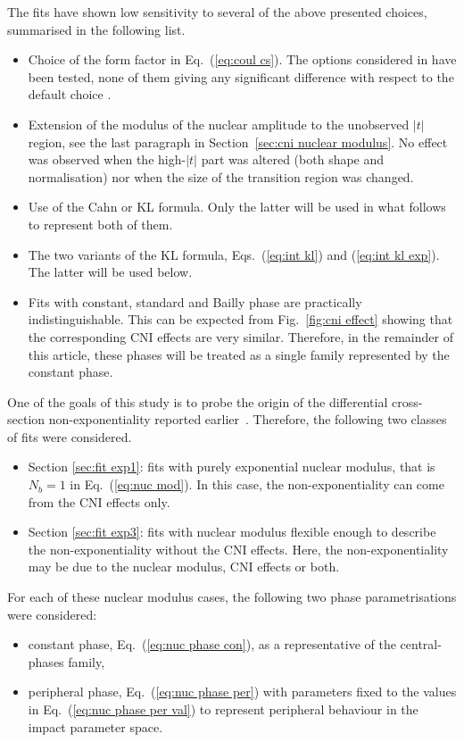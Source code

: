 The fits have shown low sensitivity to several of the above presented choices, summarised in the following list. 
\begin{itemize}
\item Choice of the form factor in Eq.~(\ref{eq:coul cs}). The options considered in \cite{elegent} have been tested, none of them giving any significant difference with respect to the default choice \cite{puckett10}.
\item Extension of the modulus of the nuclear amplitude to the unobserved $|t|$ region, see the last paragraph in Section~\ref{sec:cni nuclear modulus}. No effect was observed when the high-$|t|$ part was altered (both shape and normalisation) nor when the size of the transition region was changed.
\item Use of the Cahn or KL formula. Only the latter will be used in what follows to represent both of them.
\item The two variants of the KL formula, Eqs.~(\ref{eq:int kl}) and (\ref{eq:int kl exp}). The latter will be used below.
\item Fits with constant, standard and Bailly phase are practically indistinguishable. This can be expected from Fig.~\ref{fig:cni effect} showing that the corresponding CNI effects are very similar. Therefore, in the remainder of this article, these phases will be treated as a single family represented by the constant phase.
\end{itemize}


One of the goals of this study is to probe the origin of the differential cross-section non-exponentiality reported earlier~\cite{8tev-90m}. Therefore, the following two classes of fits were considered.
\begin{itemize}
\item Section \ref{sec:fit exp1}: fits with purely exponential nuclear modulus, that is $N_b=1$ in Eq.~(\ref{eq:nuc mod}). In this case, the non-exponentiality can come from the CNI effects only.
\item Section \ref{sec:fit exp3}: fits with nuclear modulus flexible enough to describe the non-exponentiality without the CNI effects. Here, the non-exponentiality may be due to the nuclear modulus, CNI effects or both.
\end{itemize}
For each of these nuclear modulus cases, the following two phase parametrisations were considered:
\begin{itemize}\setlength\itemsep{0pt}
\item constant phase, Eq.~(\ref{eq:nuc phase con}), as a representative of the central-phases family,
\item peripheral phase, Eq.~(\ref{eq:nuc phase per}) with parameters fixed to the values in Eq.~(\ref{eq:nuc phase per val}) to represent peripheral behaviour in the impact parameter space.
\end{itemize}

